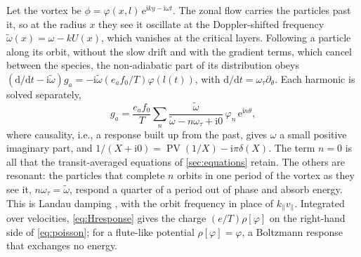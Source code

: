 \documentclass{jpp}
\newcommand{\rmd}{\text{d}}
\newcommand{\rme}{\text{e}}
\newcommand{\rmi}{\text{i}}
\newcommand{\wt}{\tilde\omega}
\newcommand{\PV}{\operatorname{PV}}
\begin{document}
Let the vortex be \(\phi = \varphi(x,l)\,\rme^{\rmi ky-\rmi\omega t}\). The zonal flow carries the particles past it, so at the radius \(x\) they see it oscillate at the Doppler-shifted frequency \(\wt(x) = \omega - kU(x)\), which vanishes at the critical layers. Following a particle along its orbit, without the slow drift and with the gradient terms, which cancel between the species, the non-adiabatic part of its distribution obeys \((\rmd/\rmd t - \rmi\wt)g_a = -\rmi\wt(e_af_0/T)\varphi(l(t))\), with \(\rmd/\rmd t = \omega_\tau\partial_\theta\). Each harmonic is solved separately,
\begin{equation}
g_a = \frac{e_af_0}{T}\sum_n\frac{\wt}{\wt - n\omega_\tau + \rmi0}\,\varphi_n\,\rme^{\rmi n\theta},
\label{eq:Hresponse}
\end{equation}
where causality, i.e., a response built up from the past, gives \(\omega\) a small positive imaginary part, and \(1/(X + \rmi0) = \PV(1/X) - \rmi\pi\delta(X)\). The term \(n = 0\) is all that the transit-averaged equations of \cref{sec:equations} retain. The others are resonant: the particles that complete \(n\) orbits in one period of the vortex as they see it, \(n\omega_\tau = \wt\), respond a quarter of a period out of phase and absorb energy. This is Landau damping \citep{Landau1946}, with the orbit frequency in place of \(k_\parallel v_\parallel\). Integrated over velocities, \cref{eq:Hresponse} gives the charge \((e/T)\rho[\varphi]\) on the right-hand side of \cref{eq:poisson}; for a flute-like potential \(\rho[\varphi] = \varphi\), a Boltzmann response that exchanges no energy.
\end{document}
